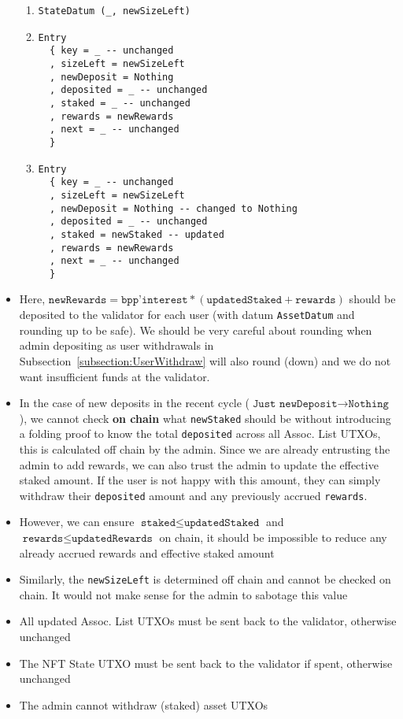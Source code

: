 \documentclass[10pt, a4paper]{article}
\theoremstyle{definition}
\begin{document}
\begin{itemize}
{\begin{enumerate}
\item{\begin{verbatim}
StateDatum (_, newSizeLeft)
\end{verbatim}
}
\item{
\begin{verbatim}
Entry
  { key = _ -- unchanged
  , sizeLeft = newSizeLeft
  , newDeposit = Nothing
  , deposited = _ -- unchanged
  , staked = _ -- unchanged
  , rewards = newRewards
  , next = _ -- unchanged
  }  
\end{verbatim}
}
\item{
\begin{verbatim}
Entry
  { key = _ -- unchanged
  , sizeLeft = newSizeLeft
  , newDeposit = Nothing -- changed to Nothing
  , deposited = _ -- unchanged
  , staked = newStaked -- updated
  , rewards = newRewards
  , next = _ -- unchanged
  }  
\end{verbatim}
}
\end{enumerate}

}



\item{Here, $\texttt{newRewards} = \texttt{bpp'interest} * (\texttt{updatedStaked}+ \texttt{rewards})$ should be deposited to the validator for each user (with datum \texttt{AssetDatum} and rounding up to be safe).
We should be very careful about rounding when admin depositing as user withdrawals in Subsection~\ref{subsection:UserWithdraw} will also round (down) and we do not want insufficient funds at the validator.
}
\item{In the case of new deposits in the recent cycle ($\texttt{Just newDeposit} \rightarrow \texttt{Nothing}$), we cannot check \textbf{on chain} what \texttt{newStaked} should be without introducing a folding proof to know the total \texttt{deposited} across all Assoc. List UTXOs, this is calculated off chain by the admin. Since we are already entrusting the admin to add rewards, we can also trust the admin to update the effective staked amount. If the user is not happy with this amount, they can simply withdraw their \texttt{deposited} amount and any previously accrued \texttt{rewards}.}
\item{However, we can ensure $\texttt{staked} \leq \texttt{updatedStaked}$ and $\texttt{rewards} \leq \texttt{updatedRewards}$ on chain, it should be impossible to reduce any already accrued rewards and effective staked amount}
\item{Similarly, the \texttt{newSizeLeft} is determined off chain and cannot be checked on chain. It would not make sense for the admin to sabotage this value}
\item{All updated Assoc. List UTXOs must be sent back to the validator, otherwise unchanged}
\item{The NFT State UTXO must be sent back to the validator if spent, otherwise unchanged}
\item{The admin cannot withdraw (staked) asset UTXOs}
\end{itemize}
\end{document}

